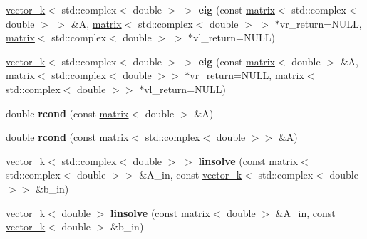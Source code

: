 \begin{DoxyCompactItemize}
\item 
\hypertarget{namespacekeycpp_a192bcf724ea788d3d3e759117220e940}{\hyperlink{classkeycpp_1_1vector__k}{vector\-\_\-k}$<$ std\-::complex$<$ double $>$ $>$ {\bfseries eig} (const \hyperlink{classkeycpp_1_1matrix}{matrix}$<$ std\-::complex$<$ double $>$ $>$ \&A, \hyperlink{classkeycpp_1_1matrix}{matrix}$<$ std\-::complex$<$ double $>$ $>$ $\ast$vr\-\_\-return=N\-U\-L\-L, \hyperlink{classkeycpp_1_1matrix}{matrix}$<$ std\-::complex$<$ double $>$ $>$ $\ast$vl\-\_\-return=N\-U\-L\-L)}\label{namespacekeycpp_a192bcf724ea788d3d3e759117220e940}

\item 
\hypertarget{namespacekeycpp_a42950497e518f5882a0689bb78fa667f}{\hyperlink{classkeycpp_1_1vector__k}{vector\-\_\-k}$<$ std\-::complex$<$ double $>$ $>$ {\bfseries eig} (const \hyperlink{classkeycpp_1_1matrix}{matrix}$<$ double $>$ \&A, \hyperlink{classkeycpp_1_1matrix}{matrix}$<$ std\-::complex$<$ double $>$$>$ $\ast$vr\-\_\-return=N\-U\-L\-L, \hyperlink{classkeycpp_1_1matrix}{matrix}$<$ std\-::complex$<$ double $>$$>$ $\ast$vl\-\_\-return=N\-U\-L\-L)}\label{namespacekeycpp_a42950497e518f5882a0689bb78fa667f}

\item 
\hypertarget{namespacekeycpp_a3905cfc35dbd146f5dbf7bcb5729c2c2}{double {\bfseries rcond} (const \hyperlink{classkeycpp_1_1matrix}{matrix}$<$ double $>$ \&A)}\label{namespacekeycpp_a3905cfc35dbd146f5dbf7bcb5729c2c2}

\item 
\hypertarget{namespacekeycpp_a4d9a9dd04453e5a417f7a9eb8ae4391b}{double {\bfseries rcond} (const \hyperlink{classkeycpp_1_1matrix}{matrix}$<$ std\-::complex$<$ double $>$$>$ \&A)}\label{namespacekeycpp_a4d9a9dd04453e5a417f7a9eb8ae4391b}

\item 
\hypertarget{namespacekeycpp_ad650072c8cf30a8674431dcf414b1c3b}{\hyperlink{classkeycpp_1_1vector__k}{vector\-\_\-k}$<$ std\-::complex$<$ double $>$ $>$ {\bfseries linsolve} (const \hyperlink{classkeycpp_1_1matrix}{matrix}$<$ std\-::complex$<$ double $>$$>$ \&A\-\_\-in, const \hyperlink{classkeycpp_1_1vector__k}{vector\-\_\-k}$<$ std\-::complex$<$ double $>$$>$ \&b\-\_\-in)}\label{namespacekeycpp_ad650072c8cf30a8674431dcf414b1c3b}

\item 
\hypertarget{namespacekeycpp_a13a89a2c6d30c991f4de63ca8f62c0e1}{\hyperlink{classkeycpp_1_1vector__k}{vector\-\_\-k}$<$ double $>$ {\bfseries linsolve} (const \hyperlink{classkeycpp_1_1matrix}{matrix}$<$ double $>$ \&A\-\_\-in, const \hyperlink{classkeycpp_1_1vector__k}{vector\-\_\-k}$<$ double $>$ \&b\-\_\-in)}\label{namespacekeycpp_a13a89a2c6d30c991f4de63ca8f62c0e1}


\end{DoxyCompactItemize}
